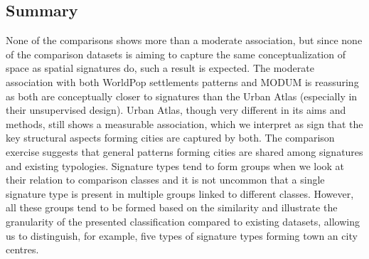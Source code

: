 \subsection*{Summary}
None of the comparisons shows more than a moderate association, but since none of the
comparison datasets is aiming to capture the same conceptualization of space as spatial
signatures do, such a result is expected. The moderate association with both WorldPop
settlements patterns and MODUM is reassuring as both are conceptually closer to
signatures than the Urban Atlas (especially in their unsupervised design). Urban Atlas,
though very different in its aims and methods, still shows a measurable association,
which we interpret as sign that the key structural aspects forming cities are captured by both. The
comparison exercise suggests that general patterns forming cities are shared among
signatures and existing typologies. Signature types tend to form groups when we look at
their relation to comparison classes and it is not uncommon that a single signature type
is present in multiple groups linked to different classes. However, all these groups
tend to be formed based on the similarity and illustrate the granularity of the
presented classification compared to existing datasets, allowing us to distinguish, for
example, five types of signature types forming town an city centres.


